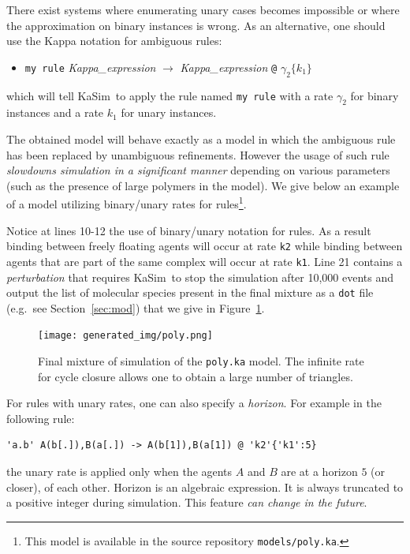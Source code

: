 \documentclass[11pt]{book}
\def\KaSim{\textsf{KaSim}}
\def\ttt#1{\texttt{#1}}
\def\rar{\rightarrow}
\def\ga{\gamma}
\def\eg{e.g.~}
\def\ITE#1{\begin{itemize}#1\end{itemize}}
\begin{document}
There exist systems where enumerating unary cases becomes impossible
or where the approximation on binary instances is wrong. As an
alternative, one should use the Kappa notation for ambiguous rules:
\ITE{
\item[] \ttt{{\textquotesingle}my rule{\textquotesingle}} {\it
  Kappa\_expression} $\rar$ {\it Kappa\_expression} \ttt{@} $\ga_2
  \{k_1\}$ } which will tell \KaSim~to apply the rule named
\ttt{{\textquotesingle}my rule{\textquotesingle}} with a rate $\ga_2$
for binary instances and a rate $k_1$ for unary instances.

The obtained model will behave exactly as a model in which the
ambiguous rule has been replaced by unambiguous refinements. However
the usage of such rule \emph{slowdowns simulation in a significant
  manner} depending on various parameters (such as the presence of
large polymers in the model). We give below an example of a model
utilizing binary/unary rates for rules\footnote{This model is
  available in the source repository \ttt{models/poly.ka}.}.



Notice at lines 10-12 the use of binary/unary notation for rules. As a
result binding between freely floating agents will occur at rate
\ttt{{\textquotesingle}k2{\textquotesingle}} while binding between
agents that are part of the same complex will occur at rate
\ttt{{\textquotesingle}k1{\textquotesingle}}. Line 21 contains a
\emph{perturbation} that requires \KaSim~to stop the simulation after
10,000 events and output the list of molecular species present in the
final mixture as a \texttt{dot} file ({\eg}see Section~\ref{sec:mod})
that we give in Figure~\ref{fig:species}.

\begin{figure}[htbp]
\begin{center}
\texttt{[image: generated\_img/poly.png]}
\caption{Final mixture %
  of simulation of the \ttt{poly.ka} model. The infinite rate for
  cycle closure allows one to obtain a large number of triangles.}
\label{fig:species}
\end{center}
\end{figure}

For rules with unary rates, one can also specify a \emph{horizon}.
For example in the following rule:
\begin{lstlisting}[language=kappa]
'a.b' A(b[.]),B(a[.]) -> A(b[1]),B(a[1]) @ 'k2'{'k1':5}
\end{lstlisting}
the unary rate is applied only when the agents $A$ and $B$ are at a
horizon $5$ (or closer), of each other. Horizon is an algebraic
expression. It is always truncated to a positive integer during
simulation.  This feature \emph{can change in the future}.
\end{document}
